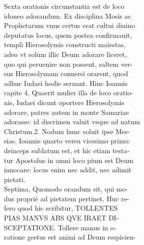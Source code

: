 \documentclass{article}
\begin{document}
\begin{pages}
                Sexta orationis circunstantia est de loco \\
                idoneo adorandum. Ex disciplina Mosis ac \\
                Prophetarum vnus certus erat cultui diuino \\
                deputatus locus, quem postea confirmauit, \\
                templi Hierosolymis constructi maiestas, \\
                adeo vt solum illic Deum adorare liceret, \\
                quo qui peruenire non possent, saltem ver- \\
                sus Hierosolymam conuersi orarent, quod \\
                adhuc Iudaei hodie seruant. Hinc Ioannis \\
                capite 4. Quaerit mulier illa de loco oratio- \\
                nis, Iudaei dicunt oportere Hierosolymis \\
                adorare, patres autem in monte Samariae \\
                adorasse: id discrimen valuit vsque ad natum \\
                Christum.2. Nodum hunc soluit ipse Mes- \\
                sias, Ioannis quarto versu vicesimo primo: \\
                deinceps sublatum est, et hic etiam testa- \\
                tur Apostolus in omni loco pium est Deum \\
                inuocare: locus enim nec addit, nec adimit \\
                pietati. \\
                Septima, Quomodo orandum sit, qui mo- \\
                dus propriè ad pietatem pertinet. Huc re- \\
                fero quod hic scribitur, TOLLENTES \\
                PIAS MANVS ABS QVE IRAET DI- \\
                SCEPTATIONE. Tollere manus in o- \\
                ratione gestus est animi ad Deum respicien- \\

\end{pages}
\end{document}
